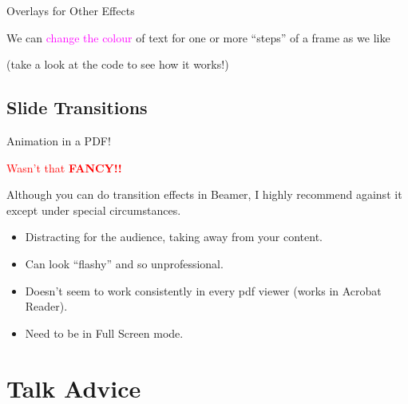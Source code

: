 \documentclass{beamer}
\begin{document}
\begin{frame}{Overlays for Other Effects}

	We can \textcolor<2,5->{magenta}{change the colour} of text for one or more ``steps'' of a frame as we like
	
	\bigskip
	
	
	\bigskip
	
	 \uncover<7->{(and in this one!)}
	
	\vfill
	
	{\scriptsize (take a look at the code to see how it works!)}

\end{frame}


\subsection{Slide Transitions}

\begin{frame}{Animation in a PDF!}

\transglitter				%

	\begin{alertblock}{}
	\centering
		\textcolor{red}{Wasn't that \textbf{FANCY!!}}
	\end{alertblock}
	
	\bigskip
	
	Although you can do transition effects in Beamer, I highly recommend against it except under special circumstances. \pause
	
	\begin{itemize}
		\item Distracting for the audience, taking away from your content.
		\item Can look ``flashy'' and so unprofessional.
		\item Doesn't seem to work consistently in every pdf viewer (works in Acrobat Reader).
		\item Need to be in Full Screen mode.
	\end{itemize}

\end{frame}


\section{Talk Advice}
\end{document}

